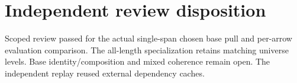 \section*{Independent review disposition}
Scoped review passed for the actual single-span chosen base pull and per-arrow evaluation comparison. The all-length specialization retains matching universe levels. Base identity/composition and mixed coherence remain open. The independent replay reused external dependency caches.
